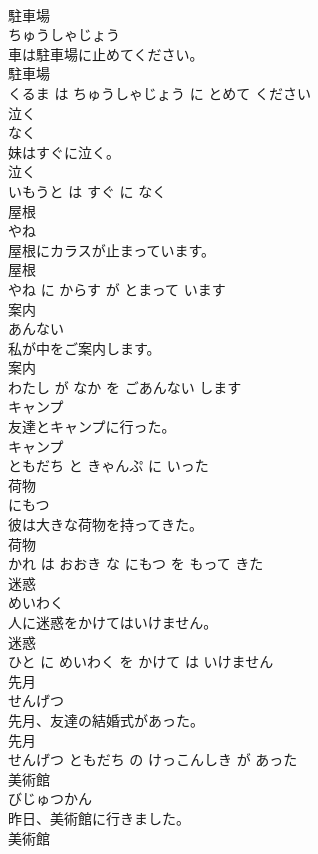 \documentclass[8pt]{extreport}
\begin{document}
\begin{CJK}{UTF8}{min}
\\	駐車場	
\\	ちゅうしゃじょう			
\\	車は駐車場に止めてください。	
\\	駐車場 
\\	くるま は ちゅうしゃじょう に とめて ください			
\\	泣く	
\\	なく			
\\	妹はすぐに泣く。	
\\	泣く 
\\	いもうと は すぐ に なく			
\\	屋根	
\\	やね			
\\	屋根にカラスが止まっています。	
\\	屋根 
\\	やね に からす が とまって います			
\\	案内	
\\	あんない			
\\	私が中をご案内します。	
\\	案内 
\\	わたし が なか を ごあんない します			
\\	キャンプ	
\\	友達とキャンプに行った。	
\\	キャンプ 
\\	ともだち と きゃんぷ に いった			
\\	荷物	
\\	にもつ			
\\	彼は大きな荷物を持ってきた。	
\\	荷物 
\\	かれ は おおき な にもつ を もって きた			
\\	迷惑	
\\	めいわく			
\\	人に迷惑をかけてはいけません。	
\\	迷惑 
\\	ひと に めいわく を かけて は いけません			
\\	先月	
\\	せんげつ			
\\	先月、友達の結婚式があった。	
\\	先月 
\\	せんげつ ともだち の けっこんしき が あった			
\\	美術館	
\\	びじゅつかん			
\\	昨日、美術館に行きました。	
\\	美術館 

\end{CJK}
\end{document}
